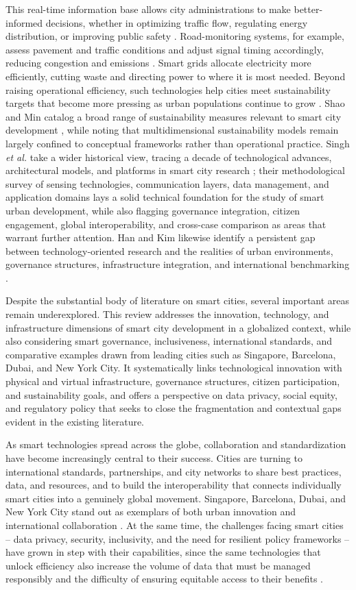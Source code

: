 \documentclass[journal]{IEEEtran}
\begin{document}
This real-time information base allows city administrations to make better-informed decisions, whether in optimizing traffic flow, regulating energy distribution, or improving public safety \cite{r1}. Road-monitoring systems, for example, assess pavement and traffic conditions and adjust signal timing accordingly, reducing congestion and emissions \cite{r3}. Smart grids allocate electricity more efficiently, cutting waste and directing power to where it is most needed. Beyond raising operational efficiency, such technologies help cities meet sustainability targets that become more pressing as urban populations continue to grow \cite{r4}. Shao and Min catalog a broad range of sustainability measures relevant to smart city development \cite{r107}, while noting that multidimensional sustainability models remain largely confined to conceptual frameworks rather than operational practice. Singh \emph{et al.} take a wider historical view, tracing a decade of technological advances, architectural models, and platforms in smart city research \cite{r108}; their methodological survey of sensing technologies, communication layers, data management, and application domains lays a solid technical foundation for the study of smart urban development, while also flagging governance integration, citizen engagement, global interoperability, and cross-case comparison as areas that warrant further attention. Han and Kim likewise identify a persistent gap between technology-oriented research and the realities of urban environments, governance structures, infrastructure integration, and international benchmarking \cite{r7}.

Despite the substantial body of literature on smart cities, several important areas remain underexplored. This review addresses the innovation, technology, and infrastructure dimensions of smart city development in a globalized context, while also considering smart governance, inclusiveness, international standards, and comparative examples drawn from leading cities such as Singapore, Barcelona, Dubai, and New York City. It systematically links technological innovation with physical and virtual infrastructure, governance structures, citizen participation, and sustainability goals, and offers a perspective on data privacy, social equity, and regulatory policy that seeks to close the fragmentation and contextual gaps evident in the existing literature.

As smart technologies spread across the globe, collaboration and standardization have become increasingly central to their success. Cities are turning to international standards, partnerships, and city networks to share best practices, data, and resources, and to build the interoperability that connects individually smart cities into a genuinely global movement. Singapore, Barcelona, Dubai, and New York City stand out as exemplars of both urban innovation and international collaboration \cite{r8}. At the same time, the challenges facing smart cities -- data privacy, security, inclusivity, and the need for resilient policy frameworks -- have grown in step with their capabilities, since the same technologies that unlock efficiency also increase the volume of data that must be managed responsibly and the difficulty of ensuring equitable access to their benefits \cite{r9,r101}.
\end{document}
